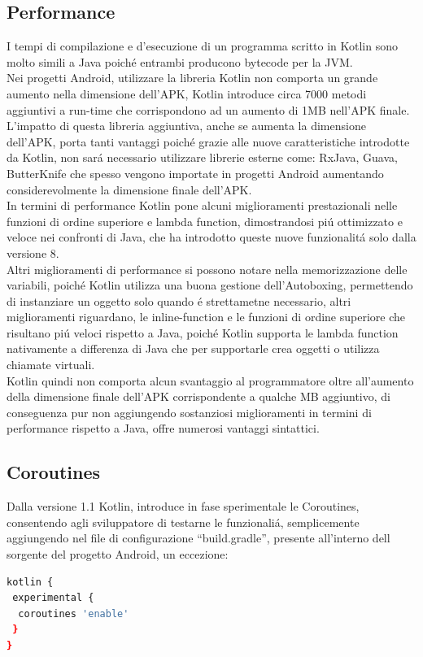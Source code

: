 \subsection{Performance}
I tempi di compilazione e d'esecuzione di un programma scritto in Kotlin sono molto simili a Java poich\'e entrambi producono bytecode per la JVM.\\
Nei progetti Android, utilizzare la libreria Kotlin non comporta un grande aumento nella dimensione dell'APK, Kotlin introduce circa 7000 metodi aggiuntivi a run-time che corrispondono ad un aumento di 1MB nell'APK finale.\\
L'impatto di questa libreria aggiuntiva, anche se aumenta la dimensione dell'APK, porta tanti vantaggi poich\'e grazie alle nuove caratteristiche introdotte da Kotlin, non sar\'a necessario utilizzare librerie esterne come: RxJava, Guava, ButterKnife che spesso vengono importate in progetti Android aumentando considerevolmente la dimensione finale dell'APK.\\
In termini di performance Kotlin pone alcuni miglioramenti prestazionali nelle funzioni di ordine superiore e lambda function, dimostrandosi pi\'u ottimizzato e veloce nei confronti di Java, che ha introdotto queste nuove funzionalit\'a solo dalla versione 8.\\
Altri miglioramenti di performance si possono notare nella memorizzazione delle variabili, poich\'e Kotlin utilizza una buona gestione dell'Autoboxing, permettendo di instanziare un oggetto solo quando \'e strettametne necessario, altri miglioramenti riguardano, le inline-function e le funzioni di ordine superiore che risultano pi\'u veloci rispetto a Java, poich\'e Kotlin supporta le lambda function nativamente a differenza di Java che per supportarle crea oggetti o utilizza chiamate virtuali.\\
Kotlin quindi non comporta alcun svantaggio al programmatore oltre all'aumento della dimensione finale dell'APK corrispondente a qualche MB aggiuntivo, di conseguenza pur non aggiungendo sostanziosi miglioramenti in termini di performance rispetto a Java, offre numerosi vantaggi sintattici.

\newpage




\subsection{Coroutines}
Dalla versione 1.1 Kotlin, introduce in fase sperimentale le Coroutines, consentendo agli sviluppatore di testarne le funzionali\'a, semplicemente aggiungendo nel file di configurazione ``build.gradle'', presente all'interno dell sorgente del progetto Android, un eccezione:
\begin{lstlisting}[language=bash,caption={Gradle Coroutines }]
kotlin {
 experimental {
  coroutines 'enable'
 }
}
\end{lstlisting}

